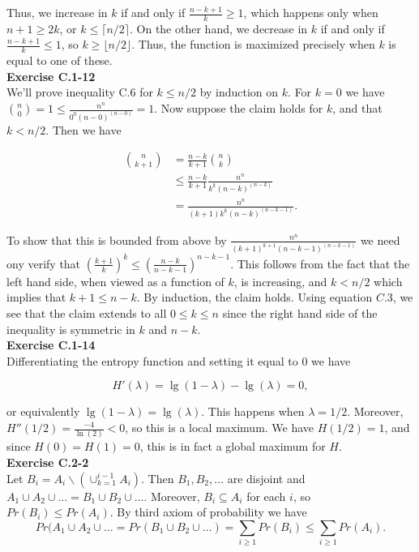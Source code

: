 \documentclass{article}
\begin{document}
Thus, we increase in $k$ if and only if $\frac{n-k+1}{k} \geq 1$, which happens only when $n+1 \geq 2k$, or $k \leq \lceil n/2 \rceil$.  On the other hand, we decrease in $k$ if and only if $\frac{n-k+1}{k} \leq 1$, so $k \geq \lfloor n/2 \rfloor$.  Thus, the function is maximized precisely when $k$ is equal to one of these. \\

\noindent\textbf{Exercise C.1-12}\\

We'll prove inequality C.6 for $k \leq n/2$ by induction on $k$. For $k=0$ we have ${n \choose 0} = 1 \leq \frac{n^n}{0^0 (n-0)^{(n-0)}} = 1$. Now suppose the claim holds for $k$, and that $k < n/2$.  Then we have 

\begin{align*} 
{n \choose k+1} &= \frac{n-k}{k+1} {n \choose k} \\
&\leq \frac{n-k}{k+1} \frac{n^n}{k^k(n-k)^{(n-k)}} \\
&=\frac{n^n}{(k+1)k^k(n-k)^{(n-k-1)}}.
\end{align*}

To show that this is bounded from above by $\frac{n^n}{(k+1)^{k+1}(n-k-1)^{(n-k-1)}}$ we need ony verify that $\left(\frac{k+1}{k}\right)^k \leq \left(\frac{n-k}{n-k-1}\right)^{n-k-1}$.  This follows from the fact that the left hand side, when viewed as a function of $k$, is increasing, and $k < n/2$ which implies that $k+1 \leq n-k$.  By induction, the claim holds.  Using equation $C.3$, we see that the claim extends to all $0 \leq k \leq n$ since the right hand side of the inequality is symmetric in $k$ and $n-k$. \\



\noindent\textbf{Exercise C.1-14}\\

Differentiating the entropy function and setting it equal to 0 we have 

\[ H'(\lambda) = \lg(1-\lambda) - \lg(\lambda) = 0,\]

or equivalently $\lg(1-\lambda) = \lg(\lambda)$.  This happens when $\lambda = 1/2$.  Moreover, $H''(1/2) = \frac{-4}{\ln(2)} < 0$, so this is a local maximum.  We have $H(1/2) = 1$, and since $H(0) = H(1) = 0$, this is in fact a global maximum for $H$. \\

\noindent\textbf{Exercise C.2-2}\\

Let $B_i = A_i \backslash (\cup_{k=1}^{i-1}A_i)$.  Then $B_1, B_2, \ldots $ are disjoint and $A_1 \cup A_2 \cup \ldots = B_1 \cup B_2 \cup \ldots$.  Moreover, $B_i \subseteq A_i$ for each $i$, so $Pr(B_i) \leq Pr(A_i)$.  By third axiom of probability we have 
\[ Pr(A_1 \cup A_2 \cup \ldots = Pr(B_1 \cup B_2 \cup \ldots) = \sum_{i \geq 1} Pr(B_i) \leq \sum_{i \geq 1} Pr(A_i).\]
\end{document}
